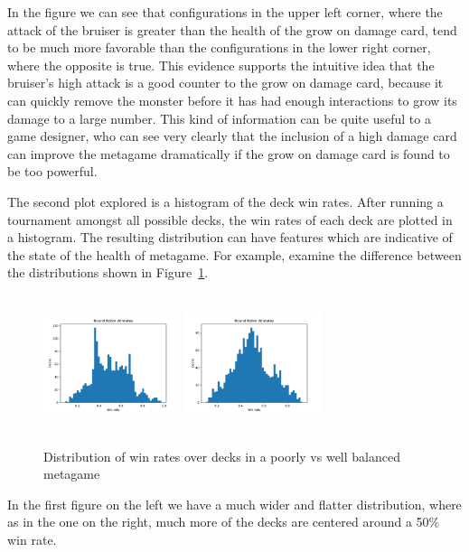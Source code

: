 In the figure we can see that configurations in the upper left corner, where the attack of the bruiser is greater than the health of the grow on damage card, tend to be much more favorable than the configurations in the lower right corner, where the opposite is true. This evidence supports the intuitive idea that the bruiser's high attack is a good counter to the grow on damage card, because it can quickly remove the monster before it has had enough interactions to grow its damage to a large number. This kind of information can be quite useful to a game designer, who can see very clearly that the inclusion of a high damage card can improve the metagame dramatically if the grow on damage card is found to be too powerful.

The second plot explored is a histogram of the deck win rates. After running a tournament amongst all possible decks, the win rates of each deck are plotted in a histogram. The resulting distribution can have features which are indicative of the state of the health of metagame. For example, examine the difference between the distributions shown in Figure~\ref{fig:special_only_dist}. 

\begin{figure}[t]
	\includegraphics[width=4cm, height=4cm]{special_only_4_5_8_8_4_8_3_3_3_5}
	\includegraphics[width=4cm, height=4cm]{special_only_1_3_4_3_3_1_7_8_5_7}
	\caption{Distribution of win rates over decks in a poorly vs well balanced metagame}
	\label{fig:special_only_dist}
\end{figure}

In the first figure on the left we have a much wider and flatter distribution, where as in the one on the right, much more of the decks are centered around a 50\% win rate. 

